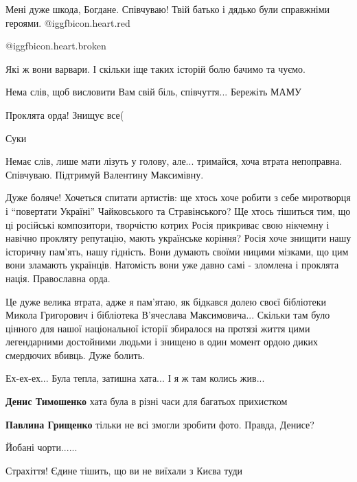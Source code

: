 \begin{itemize}
Мені дуже шкода, Богдане. Співчуваю!
Твій батько і дядько були справжніми героями. @igg{fbicon.heart.red}

 @igg{fbicon.heart.broken} 

Які ж вони варвари. І скільки іще таких історій болю бачимо та чуємо.


Нема слів, щоб висловити Вам свій біль, співчуття... Бережіть МАМУ

Проклята орда! Знищує все(

Суки


Немає слів, лише мати лізуть у голову, але... тримайся, хоча втрата непоправна.
Співчуваю. Підтримуй Валентину Максимівну.


Дуже боляче! Хочеться спитати артистів: ще хтось хоче робити з себе миротворця
і \enquote{повертати Україні} Чайковського та Стравінського? Ще хтось тішиться тим, що
ці російські композитори, творчістю котрих Росія прикриває свою нікчемну і
навічно прокляту репутацію, мають українське коріння? Росія хоче знищити нашу
історичну пам'ять, нашу гідність. Вони думають своїми ницими мізками, що цим
вони зламають українців. Натомість вони уже давно самі - зломлена і проклята
нація. Православна орда.


Це дуже велика втрата, адже я пам'ятаю, як бідкався долею своєї бібліотеки
Микола Григорович і бібліотека В'ячеслава Максимовича... Скільки там було
цінного для нашої національної історії збиралося на протязі життя цими
легендарними достойними людьми і знищено в один момент ордою диких смердючих
вбивць. Дуже болить.

Ех-ех-ех... Була тепла, затишна хата... І я ж там колись жив...

\begin{itemize} %
\textbf{Денис Тимошенко} хата була в різні часи для багатьох прихистком

\textbf{Павлина Грищенко} тільки не всі змогли зробити фото.
Правда, Денисе?
\end{itemize} %

Йобані чорти......

Страхіття! Єдине тішить, що ви не виїхали з Києва туди


\end{itemize}
